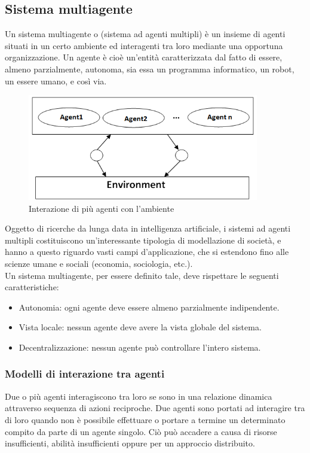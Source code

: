 \documentclass[12pt]{article}
\begin{document}
\newpage

\subsection{Sistema multiagente}
Un sistema multiagente o (sistema ad agenti multipli) è un insieme di agenti situati in un certo ambiente ed interagenti tra loro mediante una opportuna organizzazione. Un agente è cioè un'entità caratterizzata dal fatto di essere, almeno parzialmente, autonoma, sia essa un programma informatico, un robot, un essere umano, e così via.

\begin{figure}[ht]
\centering
\includegraphics[width=0.9\textwidth,height=\textheight,keepaspectratio]{Figures/Vario/MAS.png}
\caption[Interazione di più agenti con l'ambiente]{Interazione di più agenti con l'ambiente}
\label{fig:MAS}
\end{figure}

\noindent Oggetto di ricerche da lunga data in intelligenza artificiale, i sistemi ad agenti multipli costituiscono un'interessante tipologia di modellazione di società, e hanno a questo riguardo vasti campi d'applicazione, che si estendono fino alle scienze umane e sociali (economia, sociologia, etc.). \cite{SistemaMultiagente}\\

\noindent Un sistema multiagente, per essere definito tale, deve rispettare le seguenti caratteristiche: \cite{CaratteristicheMAS}
\begin{itemize}
\item Autonomia: ogni agente deve essere almeno parzialmente indipendente.
\item Vista locale: nessun agente deve avere la vista globale del sistema.
\item Decentralizzazione: nessun agente può controllare l'intero sistema.
\end{itemize}

\newpage
\subsubsection{Modelli di interazione tra agenti}
Due o più agenti interagiscono tra loro se sono in una relazione dinamica attraverso sequenza di azioni reciproche. Due agenti sono portati ad interagire tra di loro quando non è possibile effettuare o portare a termine un determinato compito da parte di un agente singolo. Ciò può accadere a causa di risorse insufficienti, abilità insufficienti oppure per un approccio distribuito.\\
\end{document}
